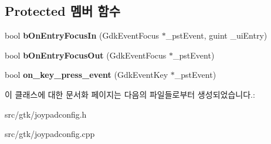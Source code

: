 \subsection*{Protected 멤버 함수}
\begin{DoxyCompactItemize}
\item 
\mbox{\label{class_v_b_a_1_1_joypad_config_dialog_a8be1420a4a3feee2e71bde31a2d7932d}} 
bool {\bfseries b\+On\+Entry\+Focus\+In} (Gdk\+Event\+Focus $\ast$\+\_\+pst\+Event, guint \+\_\+ui\+Entry)
\item 
\mbox{\label{class_v_b_a_1_1_joypad_config_dialog_a1e8f4908a9d7c4f027d4eeee8848a984}} 
bool {\bfseries b\+On\+Entry\+Focus\+Out} (Gdk\+Event\+Focus $\ast$\+\_\+pst\+Event)
\item 
\mbox{\label{class_v_b_a_1_1_joypad_config_dialog_afc9f3c90aa8e8f09811c470f97ef3993}} 
bool {\bfseries on\+\_\+key\+\_\+press\+\_\+event} (Gdk\+Event\+Key $\ast$\+\_\+pst\+Event)
\end{DoxyCompactItemize}


이 클래스에 대한 문서화 페이지는 다음의 파일들로부터 생성되었습니다.\+:\begin{DoxyCompactItemize}
\item 
src/gtk/joypadconfig.\+h\item 
src/gtk/joypadconfig.\+cpp\end{DoxyCompactItemize}
